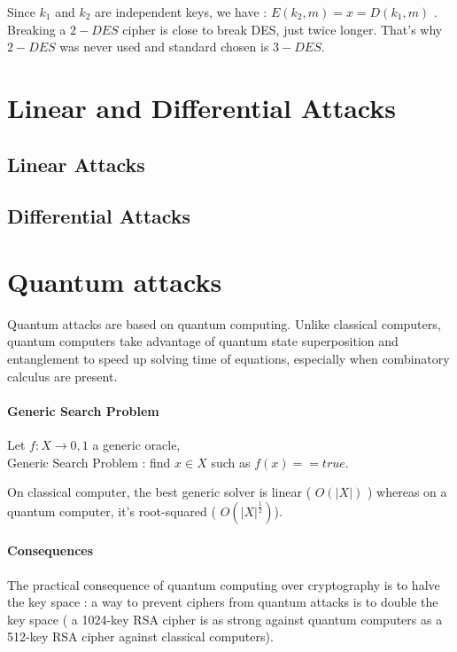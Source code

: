 Since $k_1$ and $k_2$ are independent keys, we have : $E(k_2,m) = x = D(k_1,m) $ . Breaking a $2-DES$ cipher is close to break DES, just twice longer. That's why $2-DES$ was never used and standard chosen is $3-DES$.

\section{Linear and Differential Attacks}

\subsection{Linear Attacks}
\subsection{Differential Attacks}


\section{Quantum attacks}

Quantum attacks are based on quantum computing. Unlike classical computers, quantum computers take advantage of quantum state superposition and entanglement to speed up solving time of equations, especially when combinatory calculus are present.

\paragraph{ Generic Search Problem}

\begin{mydef}
\begin{minipage}[t]{0.8\textwidth}
    Let $f : X \rightarrow {0,1}$ a generic oracle, \\
  	Generic Search Problem : find $x \in X$ such as $ f(x) == true $.
\end{minipage}
\end{mydef}

On classical computer, the best generic solver is linear ( $O(|X|)$ ) whereas on a quantum computer, it's root-squared ( $O(|X|^{\frac{1}{2}})$).


\paragraph{ Consequences } 
The practical consequence of quantum computing over cryptography is to halve the key space : a way to prevent ciphers from quantum attacks is to double the key space ( a 1024-key RSA cipher is as strong against quantum computers as a 512-key RSA cipher against classical computers).


